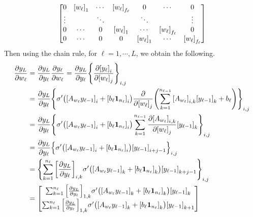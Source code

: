 \documentclass[10pt]{article}
\begin{document}
\begin{enumerate}[(a)]
$$\begin{bmatrix}
        0              & \qty[w_\ell]_1 & \cdots                & \qty[w_\ell]_{f_\ell} & 0                     & \cdots                & 0      \\
        \vdots         &                & \ddots                &                       & \ddots                &                       & \vdots \\
        0              & \cdots         & 0                     & \qty[w_\ell]_1        & \cdots                & \qty[w_\ell]_{f_\ell} & 0      \\
        0              & \cdots         & 0                     & 0                     & \qty[w_\ell]_1        & \cdots                & \qty[w_\ell]_{f_\ell}
    \end{bmatrix}$$
    Then using the chain rule, for $\ell = 1, \cdots, L$, we obtain the following.
    \begin{align*}
        \frac{\partial y_L}{\partial w_\ell} &= \frac{\partial y_L}{\partial y_\ell}\frac{\partial y_\ell}{\partial w_\ell} = \frac{\partial y_L}{\partial y_\ell}\qty{\frac{\partial\qty[y_\ell]_i}{\partial\qty[w_\ell]_j}}_{i, j} \\
        &= \frac{\partial y_L}{\partial y_\ell}\qty{\sigma'\qty(\qty[A_{w_\ell}y_{\ell-1}]_i + \qty[b_\ell\mathbf{1}_{n_\ell}]_i)\frac{\partial}{\partial\qty[w_\ell]_j}\qty(\sum_{k=1}^{n_{\ell-1}}\qty[A_{w_\ell}]_{i, k}\qty[y_{\ell-1}]_k + b_\ell)}_{i, j} \\
        &= \frac{\partial y_L}{\partial y_\ell}\qty{\sigma'\qty(\qty[A_{w_\ell}y_{\ell-1}]_i + \qty[b_\ell\mathbf{1}_{n_\ell}]_i)\sum_{k=1}^{n_{\ell-1}}\frac{\partial\qty[A_{w_\ell}]_{i, k}}{\partial\qty[w_\ell]_j}\qty[y_{\ell-1}]_k}_{i, j} \\
        &= \frac{\partial y_L}{\partial y_\ell}\qty{\sigma'\qty(\qty[A_{w_\ell}y_{\ell-1}]_i + \qty[b_\ell\mathbf{1}_{n_\ell}]_i)\qty[y_{\ell-1}]_{i+j-1}}_{i, j} \\
        &= \qty{\sum_{k=1}^{n_\ell}\qty[\frac{\partial y_L}{\partial y_\ell}]_{i, k}\sigma'\qty(\qty[A_{w_\ell}y_{\ell-1}]_k + \qty[b_\ell\mathbf{1}_{n_\ell}]_k)\qty[y_{\ell-1}]_{k+j-1}}_{i, j} \\
        &= \begin{bmatrix}
            \sum_{k=1}^{n_\ell}\qty[\frac{\partial y_L}{\partial y_\ell}]_{1, k}\sigma'\qty(\qty[A_{w_\ell}y_{\ell-1}]_k + \qty[b_\ell\mathbf{1}_{n_\ell}]_k)\qty[y_{\ell-1}]_{k} \\
            \sum_{k=1}^{n_\ell}\qty[\frac{\partial y_L}{\partial y_\ell}]_{1, k}\sigma'\qty(\qty[A_{w_\ell}y_{\ell-1}]_k + \qty[b_\ell\mathbf{1}_{n_\ell}]_k)\qty[y_{\ell-1}]_{k+1} \\

\end{bmatrix}
\end{align*}
\end{enumerate}
\end{document}
